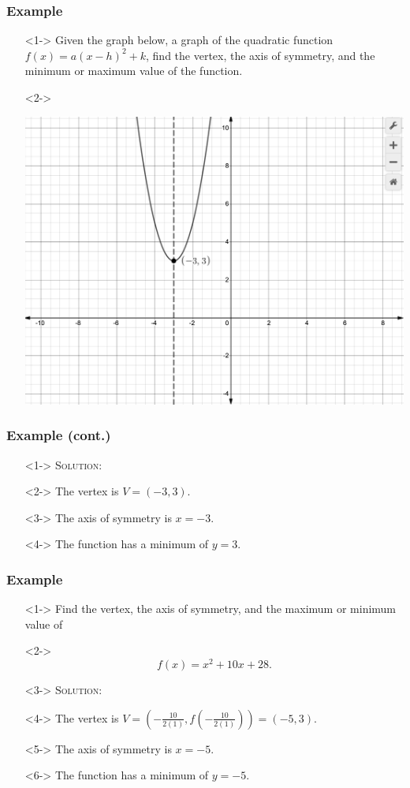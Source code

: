 \documentclass[handout]{beamer}
\begin{document}
\begin{frame}
	\frametitle{Example} 
	\begin{enumerate}
		\item[]<1-> Given the graph below, a graph of the quadratic function $f(x)=a(x-h)^{2}+k$, find the vertex, the axis of symmetry, and the minimum or maximum value of the function.  
		\item[]<2->
			\begin{center}
				\includegraphics[scale=0.2]{3_3_1.png} 		
			\end{center} 
	\end{enumerate}
\end{frame}

\begin{frame}
	\frametitle{Example (cont.)} 
	\begin{enumerate}
		\item[]<1-> \textsc{Solution:} 
		\item[]<2-> The vertex is $V=(-3,3)$. 
		\item[]<3-> The axis of symmetry is $x=-3$. 
		\item[]<4-> The function has a minimum of $y=3$.  
	\end{enumerate}
\end{frame}

\begin{frame}
	\frametitle{Example} 
	\begin{enumerate}
		\item[]<1-> Find the vertex, the axis of symmetry, and the maximum or minimum value of 
		\item[]<2->\[ f(x)=x^{2}+10x+28. \] 
		\item[]<3-> \textsc{Solution:} 
		\item[]<4-> The vertex is $V=\left( -\frac{10}{2(1)}, f \left( -\frac{10}{2(1)} \right)\right)=( -5,3 )$. 
		\item[]<5-> The axis of symmetry is $x=-5$. 
		\item[]<6-> The function has a minimum of $y=-5$.  
	\end{enumerate}
\end{frame}
\end{document}

